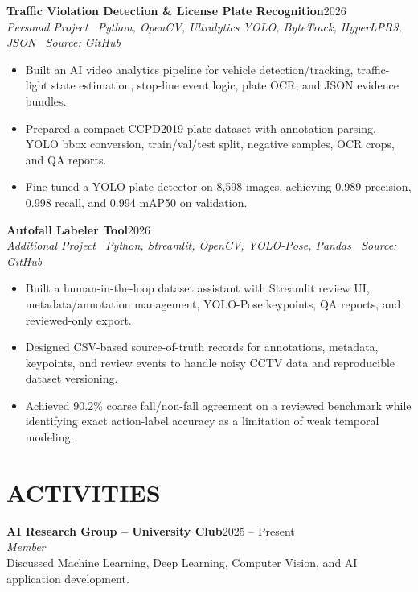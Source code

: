 \documentclass[10pt,a4paper]{article}
\newenvironment{cvitems}{%
    \begin{itemize}[leftmargin=1.2em,itemsep=0pt,topsep=1pt,parsep=0pt]
}{%
    \end{itemize}
}
\newcommand{\entryhead}[2]{%
    \noindent\textbf{#1}\hfill #2\\[-2pt]
}
\newcommand{\entrysub}[1]{%
    \noindent\textit{#1}\\[-1pt]
}
\begin{document}
\entryhead{Traffic Violation Detection \& License Plate Recognition}{2026}
\entrysub{Personal Project \textbar\ Python, OpenCV, Ultralytics YOLO, ByteTrack, HyperLPR3, JSON \textbar\ Source: \href{https://github.com/NguyenKhacBao564/Traffic-Violation-Detection-and-License-Plate-Recognition}{GitHub}}
\begin{cvitems}
    \item Built an AI video analytics pipeline for vehicle detection/tracking, traffic-light state estimation, stop-line event logic, plate OCR, and JSON evidence bundles.
    \item Prepared a compact CCPD2019 plate dataset with annotation parsing, YOLO bbox conversion, train/val/test split, negative samples, OCR crops, and QA reports.
    \item Fine-tuned a YOLO plate detector on 8,598 images, achieving 0.989 precision, 0.998 recall, and 0.994 mAP50 on validation.
\end{cvitems}

\entryhead{Autofall Labeler Tool}{2026}
\entrysub{Additional Project \textbar\ Python, Streamlit, OpenCV, YOLO-Pose, Pandas \textbar\ Source: \href{https://github.com/NguyenKhacBao564/autofall-labeler-tool}{GitHub}}
\begin{cvitems}
    \item Built a human-in-the-loop dataset assistant with Streamlit review UI, metadata/annotation management, YOLO-Pose keypoints, QA reports, and reviewed-only export.
    \item Designed CSV-based source-of-truth records for annotations, metadata, keypoints, and review events to handle noisy CCTV data and reproducible dataset versioning.
    \item Achieved 90.2\% coarse fall/non-fall agreement on a reviewed benchmark while identifying exact action-label accuracy as a limitation of weak temporal modeling.
\end{cvitems}

\section{ACTIVITIES}
\entryhead{AI Research Group -- University Club}{2025 -- Present}
\entrysub{Member}
Discussed Machine Learning, Deep Learning, Computer Vision, and AI application development.
\end{document}
